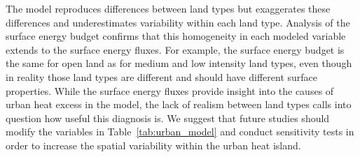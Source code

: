 \documentclass[draft,linenumbers]{agujournal}
\begin{document}
The model reproduces differences between land types but exaggerates these differences and underestimates variability within each land type. Analysis of the surface energy budget confirms that this homogeneity in each modeled variable extends to the surface energy fluxes.  
For example, the surface energy budget is the same for open land as for medium and low intensity land types, even though in reality those land types are different and should have different surface properties. While the surface energy fluxes provide insight into the causes of urban heat excess in the model, the lack of realism between land types calls into question how useful this diagnosis is. 
We suggest that future studies should modify the variables in Table~\ref{tab:urban_model} and conduct sensitivity tests in order to increase the spatial variability within the urban heat island.
\end{document}
